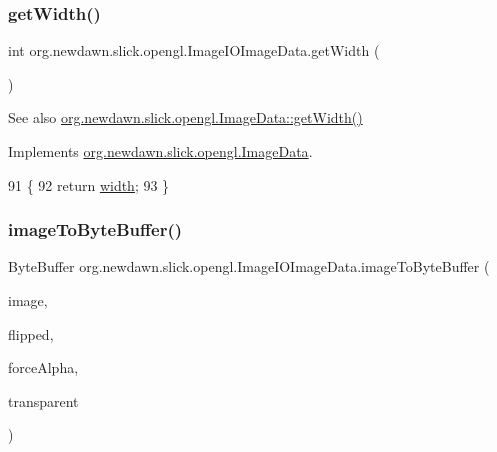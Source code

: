 \subsubsection{\texorpdfstring{get\+Width()}{getWidth()}}
{\footnotesize\ttfamily int org.\+newdawn.\+slick.\+opengl.\+Image\+I\+O\+Image\+Data.\+get\+Width (\begin{DoxyParamCaption}{ }\end{DoxyParamCaption})\hspace{0.3cm}{\ttfamily [inline]}}

\begin{DoxySeeAlso}{See also}
\mbox{\hyperlink{interfaceorg_1_1newdawn_1_1slick_1_1opengl_1_1_image_data_a59fd53f0ca1e501de35c1b2b4a7e69c5}{org.\+newdawn.\+slick.\+opengl.\+Image\+Data\+::get\+Width()}} 
\end{DoxySeeAlso}


Implements \mbox{\hyperlink{interfaceorg_1_1newdawn_1_1slick_1_1opengl_1_1_image_data_a59fd53f0ca1e501de35c1b2b4a7e69c5}{org.\+newdawn.\+slick.\+opengl.\+Image\+Data}}.


\begin{DoxyCode}
91                           \{
92         \textcolor{keywordflow}{return} \mbox{\hyperlink{classorg_1_1newdawn_1_1slick_1_1opengl_1_1_image_i_o_image_data_a4455bbf2c2f9c41df712d067260288f3}{width}};
93     \}
\end{DoxyCode}
\mbox{\label{classorg_1_1newdawn_1_1slick_1_1opengl_1_1_image_i_o_image_data_ac5ab7c2b917c07b09fa100784fc7b8d7}} 
\subsubsection{\texorpdfstring{image\+To\+Byte\+Buffer()}{imageToByteBuffer()}}
{\footnotesize\ttfamily Byte\+Buffer org.\+newdawn.\+slick.\+opengl.\+Image\+I\+O\+Image\+Data.\+image\+To\+Byte\+Buffer (\begin{DoxyParamCaption}\item[{Buffered\+Image}]{image,  }\item[{boolean}]{flipped,  }\item[{boolean}]{force\+Alpha,  }\item[{int \mbox{[}$\,$\mbox{]}}]{transparent }\end{DoxyParamCaption})\hspace{0.3cm}{\ttfamily [inline]}}


